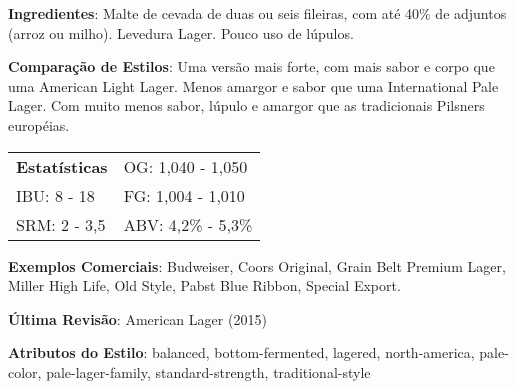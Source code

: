 \textbf{Ingredientes}: Malte de cevada de duas ou seis fileiras, com até 40\% de adjuntos (arroz ou milho). Levedura Lager. Pouco uso de lúpulos.

\textbf{Comparação de Estilos}: Uma versão mais forte, com mais sabor e corpo que uma American Light Lager. Menos amargor e sabor que uma International Pale Lager. Com muito menos sabor, lúpulo e amargor que as tradicionais Pilsners européias.

\begin{tabular}{@{}p{35mm}p{35mm}@{}}
  \textbf{Estatísticas} & OG: 1,040 - 1,050 \\
  IBU: 8 - 18  & FG: 1,004 - 1,010 \\
  SRM: 2 - 3,5  & ABV: 4,2\% - 5,3\%
\end{tabular}

\textbf{Exemplos Comerciais}: Budweiser, Coors Original, Grain Belt Premium Lager, Miller High Life, Old Style, Pabst Blue Ribbon, Special Export.

\textbf{Última Revisão}: American Lager (2015)

\textbf{Atributos do Estilo}: balanced, bottom-fermented, lagered, north-america, pale-color, pale-lager-family, standard-strength, traditional-style
